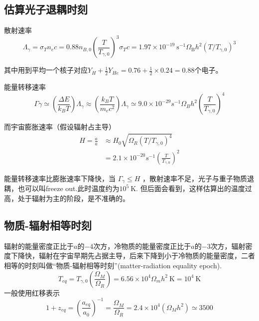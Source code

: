 \documentclass[]{ctexart}
\begin{document}
\subsection*{估算光子退耦时刻}

散射速率
\begin{equation}
    \Lambda_\gamma=\sigma_{T} n_{e} c=0.88 n_{B,0}\left(\frac{T}{T_{\gamma,0}}\right)^{3} \sigma_{T} c=1.97 \times 10^{-19} \mathrm{~s}^{-1} \Omega_{\mathrm{B}}{h }^{2}\left(T / T_{\gamma,0}\right)^{3}
\end{equation}

其中用到平均一个核子对应$Y_H+\frac{1}{2}Y_{He}=0.76+\frac{1}{2}\times 0.24=0.88$个电子。

能量转移速率
\begin{equation}
    \Gamma \gamma \simeq\left(\frac{\Delta E}{k_{B} T}\right) \Lambda_{\gamma} \approx\left(\frac{k_{B} T}{m_{e} c^{2}}\right) \Lambda_{\gamma} \simeq 9.0 \times 10^{-29} s^{-1} \Omega_{B} h^{2}\left(\frac{T}{T_{\gamma,{0}}}\right)^{4}
\end{equation}

而宇宙膨胀速率（假设辐射占主导）
\begin{equation}
    \begin{aligned}
        H=\frac{\dot{a}}{a} & \approx H_{0} \sqrt{\Omega_R\left(T / T_{\gamma,{0}}\right)^{4}} \\
    &=2.1\times 10^{-20} s^{-1} \left(\frac{T}{T_{\gamma,{0}}}\right)^{2}
    \end{aligned}
\end{equation}

能量转移速率比膨胀速率下降快，当 $\Gamma_{\gamma} \leq H$ ，散射速率不足，光子与重子物质退耦，也可以叫freeze out.此时温度约为$10^5 \mathrm{~K}$.
但后面会看到，这样估算出的温度过高，处于辐射为主的阶段，是不准确的。

\subsection*{物质-辐射相等时刻}
辐射的能量密度正比于$a$的$-4$次方，冷物质的能量密度正比于$a$的$-3$次方，辐射密度下降快，辐射在宇宙早期先占据主导，后来下降到小于冷物质的能量密度，二者相等的时刻叫做“物质-辐射相等时刻”(matter-radiation equality epoch).
\begin{equation}
    T_{eq}=T_{\gamma,0}\left(\frac{\Omega_{M}}{\Omega_{R}}\right)=6.56 \times 10^{4} \Omega_{m} h^{2} \mathrm{~K} =10^{4} \mathrm{~K}
\end{equation}
一般使用红移表示
\begin{equation}
    1+z_{eq}=\left(\frac{a_{e q}}{a_{0}}\right)^{-1}=\frac{\Omega_{M}}{\Omega_{R}}=2.4 \times 10^{4}\left(\Omega_M h^{2}\right) \simeq 3500
\end{equation}
\end{document}
